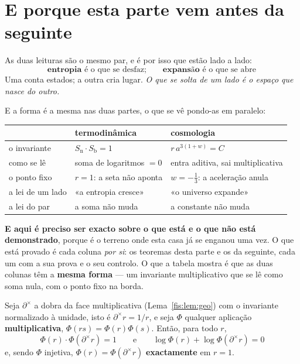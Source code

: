 \documentclass[livro.tex]{subfiles}
\begin{document}
\section{E porque esta parte vem antes da seguinte}\label{fis:termo-cosmo}

\noindent As duas leituras são o mesmo par, e é por isso que estão lado a lado:
\[
\boxed{\;\textbf{entropia} \text{ é o que se desfaz};\qquad
\textbf{expansão} \text{ é o que se abre}\;}
\]
Uma conta estados; a outra cria lugar. \emph{O que se solta de um lado é o espaço
que nasce do outro.}

\medskip\noindent E a forma é a mesma nas duas partes, o que se vê pondo-as em
paralelo:
\begin{center}\small
\begin{tabular}{@{}lll@{}}
\toprule
& \textbf{termodinâmica} & \textbf{cosmologia} \\
\midrule
o invariante & $S_{\text{n}}\!\cdot\!S_{\text{b}}=1$ & $r\,a^{3(1+w)}=C$ \\
como se lê & soma de logaritmos $=0$ & entra aditiva, sai multiplicativa \\
o ponto fixo & $r=1$: a seta não aponta & $w=-\tfrac13$: a aceleração anula \\
a lei de um lado & «a entropia cresce» & «o universo expande» \\
a lei do par & a soma não muda & a constante não muda \\
\bottomrule
\end{tabular}
\end{center}

\medskip\noindent\textbf{E aqui é preciso ser exacto sobre o que está e o que não
está demonstrado}, porque é o terreno onde esta casa já se enganou uma vez. O que
está provado é cada coluna \emph{por si}: os teoremas desta parte e os da
seguinte, cada um com a sua prova e o seu controlo. O que a tabela mostra é que
as duas colunas têm a \textbf{mesma forma} --- um invariante multiplicativo que
se lê como soma nula, com o ponto fixo na borda.

\begin{lema}\label{fis:lem:dobramult}
Seja $\partial^{\times}$ a dobra da face multiplicativa (Lema~\ref{fis:lem:geo})
com o invariante normalizado à unidade, isto é $\partial^{\times}r=1/r$, e seja
$\Phi$ qualquer aplicação \textbf{multiplicativa}, $\Phi(rs)=\Phi(r)\Phi(s)$.
Então, para todo $r$,
\[
\boxed{\;\Phi(r)\cdot\Phi(\partial^{\times}r)=1
\qquad\text{e}\qquad
\log\Phi(r)+\log\Phi(\partial^{\times}r)=0\;}
\]
e, sendo $\Phi$ injetiva, $\Phi(r)=\Phi(\partial^{\times}r)$ \textbf{exactamente}
em $r=1$.
\end{lema}
\end{document}
